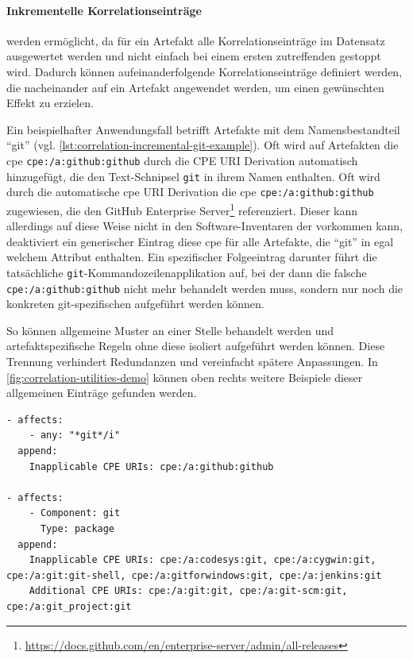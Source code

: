 \paragraph{Inkrementelle Korrelationseinträge}
werden ermöglicht, da für ein Artefakt alle Korrelationseinträge im Datensatz ausgewertet werden und nicht einfach bei einem ersten zutreffenden gestoppt wird.
Dadurch können aufeinanderfolgende Korrelationseinträge definiert werden, die nacheinander auf ein Artefakt angewendet werden, um einen gewünschten Effekt zu erzielen.

Ein beispielhafter Anwendungsfall betrifft Artefakte mit dem Namensbestandteil \enquote{git} (vgl. \autoref{lst:correlation-incremental-git-example}).
Oft wird auf Artefakten die \acrshort{cpe} \texttt{cpe:/a:github:github} durch die CPE URI Derivation automatisch hinzugefügt, die den Text-Schnipsel \texttt{git} in ihrem Namen enthalten.
Oft wird durch die automatische \acrshort{cpe} URI Derivation die \acrshort{cpe} \texttt{cpe:/a:github:github} zugewiesen, die den GitHub Enterprise Server\footnote{\url{https://docs.github.com/en/enterprise-server/admin/all-releases}} referenziert.
Dieser kann allerdings auf diese Weise nicht in den Software-Inventaren der \metaeffektsp vorkommen kann, deaktiviert ein generischer Eintrag diese \acrshort{cpe} für alle Artefakte, die \enquote{git} in egal welchem Attribut enthalten.
Ein spezifischer Folgeeintrag darunter führt die tatsächliche \texttt{git}-Kommandozeilenapplikation auf, bei der dann die falsche \texttt{cpe:/a:github:github} nicht mehr behandelt werden muss, sondern nur noch die konkreten git-spezifischen  aufgeführt werden können.

So können allgemeine Muster an einer Stelle behandelt werden und artefaktspezifische Regeln ohne diese isoliert aufgeführt werden können.
Diese Trennung verhindert Redundanzen und vereinfacht spätere Anpassungen.
In \autoref{fig:correlation-utilities-demo} können oben rechts weitere Beispiele dieser allgemeinen Einträge gefunden werden.

\begin{lstlisting}[style=yaml,caption={Inkrementelle Korrelationseinträge für das Kommandozeilentool git},label={lst:correlation-incremental-git-example}]
- affects:
    - any: "*git*/i"
  append:
    Inapplicable CPE URIs: cpe:/a:github:github

- affects:
    - Component: git
      Type: package
  append:
    Inapplicable CPE URIs: cpe:/a:codesys:git, cpe:/a:cygwin:git, cpe:/a:git:git-shell, cpe:/a:gitforwindows:git, cpe:/a:jenkins:git
    Additional CPE URIs: cpe:/a:git:git, cpe:/a:git-scm:git, cpe:/a:git_project:git
\end{lstlisting}

